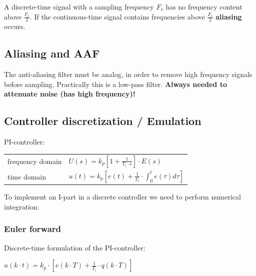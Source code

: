 \documentclass[10pt,a4paper]{scrartcl}
\begin{document}
\begin{multicols*}{3}
	
	
	
	\finn	
	
	A discrete-time signal with a sampling frequency $F_s$ has no frequency content above $\frac{F_s}{2}$. If the continuous-time signal contains frequencies above $\frac{F_s}{2}$ \textbf{aliasing} occurs.
	
	\subsection*{Aliasing and AAF}
	
	
	The anti-aliasing filter must be analog, in order to remove high frequency signals before sampling. Practically this is a low-pass filter. \textbf{Always needed to attenuate noise (has high frequency)!}
	
	\subsection*{Controller discretization / Emulation}
	
	PI-controller:
	
	\begin{tabular}{l@{ : }l}
	frequency domain& $U(s)=k_p\left[1+\frac{1}{T_i\cdot s}\right]\cdot E(s)$\\
	time domain&$u(t)=k_p\left[e(t)+\frac{1}{T_i}\cdot\int_0^t{e(\tau)d\tau}\right]$
	\end{tabular}
	
	To implement an I-part in a discrete controller we need to perform numerical integration:
	
	
	
	\subsubsection{Euler forward}
	
	Discrete-time formulation of the PI-controller:

	$u(k\cdot t)=k_p\cdot\left[ e(k\cdot T)+\frac{1}{T_i}\cdot q(k\cdot T)\right]$
	

\end{multicols*}
\end{document}
